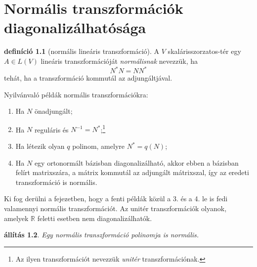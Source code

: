 \documentclass[9pt, a4paper, showtrims]{memoir}
\theoremstyle{plain}
\newtheorem{proposition}{állítás}[chapter]
\theoremstyle{remark}
\theoremstyle{definition}
\newtheorem{definition}[proposition]{definíció}
\begin{document}
\chapter{Normális transzformációk diagonalizálhatósága}
\begin{definition}[normális lineáris transzformáció]
    A $V$ skalárisszorzatos-tér egy $A\in L\left( V \right)$ lineáris transzformációját
    \emph{normálisnak} nevezzük,
    ha $$N^\ast N=NN^\ast$$ tehát, ha a transzformáció kommutál az adjungáltjával.
\end{definition}
Nyilvánvaló példák normális transzformációkra:
\begin{enumerate}
    \item Ha $N$ önadjungált;
    \item Ha $N$ reguláris és $N^{-1}=N^\ast$;\footnote{Az ilyen transzformációt nevezzük
            \emph{unitér}
        transzformációnak.}
    \item Ha létezik olyan $q$ polinom, amelyre $N^\ast=q\left( N \right)$;
    \item
        Ha $N$ egy ortonormált bázisban diagonalizálható, akkor
ebben a bázisban felírt matrixszára, a mátrix kommutál az adjungált mátrixszal, 
így az eredeti transzformáció is normális.
\end{enumerate}
Ki fog derülni a fejezetben, hogy a fenti példák közül a 3. és a 4. le is fedi valamennyi normális transzformációt.
Az unitér transzformációk olyanok, amelyek $\mathbb{R}$ feletti esetben nem diagonalizálhatók.
\begin{proposition}
    Egy normális transzformáció polinomja is normális.
\end{proposition}
\end{document}
